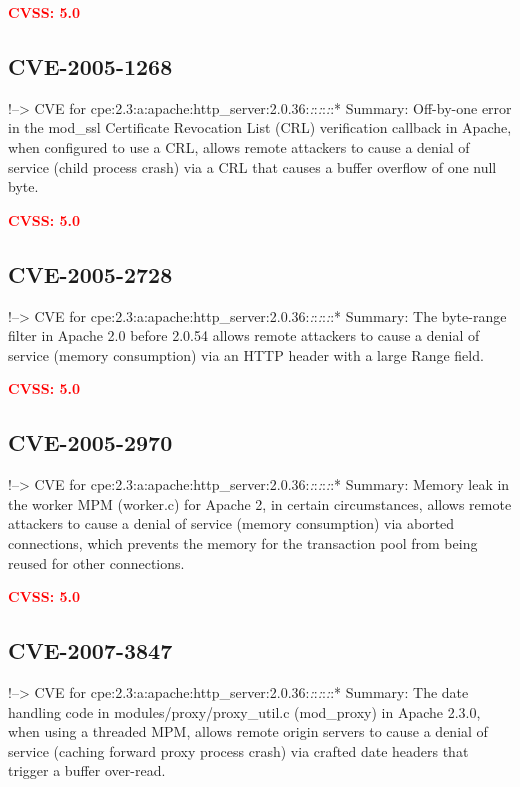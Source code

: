 \documentclass[a4paper, 12pt]{article}
\begin{document}
\textbf{\textcolor{red}{CVSS: 5.0}}

\hypertarget{cve-2005-1268}{%
\subsection{CVE-2005-1268}\label{cve-2005-1268}}

!--\textgreater{} CVE for
cpe:2.3:a:apache:http\_server:2.0.36:\emph{:}:\emph{:}:\emph{:}:*
Summary: Off-by-one error in the mod\_ssl Certificate Revocation List
(CRL) verification callback in Apache, when configured to use a CRL,
allows remote attackers to cause a denial of service (child process
crash) via a CRL that causes a buffer overflow of one null byte.

\textbf{\textcolor{red}{CVSS: 5.0}}

\hypertarget{cve-2005-2728}{%
\subsection{CVE-2005-2728}\label{cve-2005-2728}}

!--\textgreater{} CVE for
cpe:2.3:a:apache:http\_server:2.0.36:\emph{:}:\emph{:}:\emph{:}:*
Summary: The byte-range filter in Apache 2.0 before 2.0.54 allows remote
attackers to cause a denial of service (memory consumption) via an HTTP
header with a large Range field.

\textbf{\textcolor{red}{CVSS: 5.0}}

\hypertarget{cve-2005-2970}{%
\subsection{CVE-2005-2970}\label{cve-2005-2970}}

!--\textgreater{} CVE for
cpe:2.3:a:apache:http\_server:2.0.36:\emph{:}:\emph{:}:\emph{:}:*
Summary: Memory leak in the worker MPM (worker.c) for Apache 2, in
certain circumstances, allows remote attackers to cause a denial of
service (memory consumption) via aborted connections, which prevents the
memory for the transaction pool from being reused for other connections.

\textbf{\textcolor{red}{CVSS: 5.0}}

\hypertarget{cve-2007-3847}{%
\subsection{CVE-2007-3847}\label{cve-2007-3847}}

!--\textgreater{} CVE for
cpe:2.3:a:apache:http\_server:2.0.36:\emph{:}:\emph{:}:\emph{:}:*
Summary: The date handling code in modules/proxy/proxy\_util.c
(mod\_proxy) in Apache 2.3.0, when using a threaded MPM, allows remote
origin servers to cause a denial of service (caching forward proxy
process crash) via crafted date headers that trigger a buffer over-read.
\end{document}
